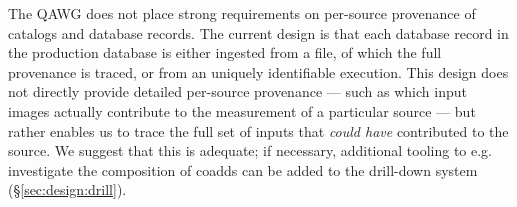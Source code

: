The QAWG does not place strong requirements on per-source provenance of catalogs and database records.
The current design is that each database record in the production database is either ingested from a file, of which the full provenance is traced, or from an uniquely identifiable execution.
This design does not directly provide detailed per-source provenance --- such as which input images actually contribute to the measurement of a particular source --- but rather enables us to trace the full set of inputs that \textit{could have} contributed to the source.
We suggest that this is adequate; if necessary, additional tooling to e.g. investigate the composition of coadds can be added to the drill-down system (\S\ref{sec:design:drill}).
